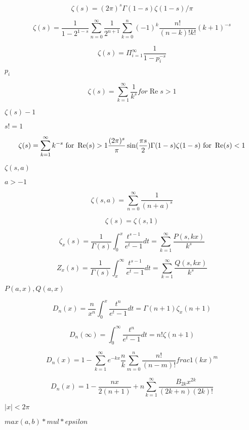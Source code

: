 \documentclass{article}
\begin{document}
\[ \zeta(s) = (2\pi)^s \Gamma(1-s) \zeta(1-s) / \pi \]
\pagebreak

\[ \zeta(s) = \frac{1}{1-2^{1-s}} \sum_{n=0}^{\infty} \frac{1}{2^{n+1}} \sum_{k=0}^{n} (-1)^k \frac{n!}{(n-k)!k!} (k+1)^{-s} \]
\pagebreak

\[ \zeta(s) = \Pi_{i=1}^\infty \frac{1}{1 - p_i^{-s}} \]
\pagebreak

$ {p_i} $
\pagebreak

\[ \renewcommand\Re{\operatorname{Re}} \renewcommand\Im{\operatorname{Im}} \zeta(s) = \sum_{k=1}^{\infty} \frac{1}{k^{s}} for \Re{s} > 1 \]
\pagebreak

$ \zeta(s) - 1 $
\pagebreak

$ s != 1 $
\pagebreak

\[ \zeta(s) = \sum_{k=1}^{\infty} k^{-s} \mbox{ for } \Re(s) > 1 \\ \frac{(2\pi)^s}{\pi} \sin(\frac{\pi s}{2}) \Gamma(1 - s) \zeta(1 - s) \mbox{ for } \Re(s) < 1 \]
\pagebreak

$ \zeta(s,a) $
\pagebreak

$ a > -1 $
\pagebreak

\[ \zeta(s,a) = \sum_{n=0}^{\infty} \frac{1}{(n+a)^s} \]
\pagebreak

\[ \zeta(s) = \zeta(s,1) \]
\pagebreak

\[ \zeta_x(s) = \frac{1}{\Gamma(s)}\int_{0}^{x}\frac{t^{s-1}}{e^t-1}dt = \sum_{k=1}^{\infty}\frac{P(s,kx)}{k^s} \]
\pagebreak

\[ Z_x(s) = \frac{1}{\Gamma(s)}\int_{x}^{\infty}\frac{t^{s-1}}{e^t-1}dt = \sum_{k=1}^{\infty}\frac{Q(s,kx)}{k^s} \]
\pagebreak

$ P(a,x), Q(a,x) $
\pagebreak

\[ D_n(x) = \frac{n}{x^n}\int_{0}^{x}\frac{t^n}{e^t-1}dt = \Gamma(n+1)\zeta_x(n+1) \]
\pagebreak

\[ D_n(\infty) = \int_{0}^{\infty}\frac{t^n}{e^t-1}dt = n!\zeta(n+1) \]
\pagebreak

\[ D_n(x) = 1 - \sum_{k = 1}^{\infty} e^{-kx} \frac{n}{k}\sum_{m=0}^{n}\frac{n!}{(n-m)!}frac{1}{(kx)^m} \]
\pagebreak

\[ D_n(x) = 1 - \frac{n x}{2(n+1)} + n \sum_{k = 1}^{\infty} \frac{B_{2k} x^{2k}}{(2k + n)(2k)!} \]
\pagebreak

$ |x| < 2\pi $
\pagebreak

$ max(a,b) * mul * epsilon $
\pagebreak
\end{document}

